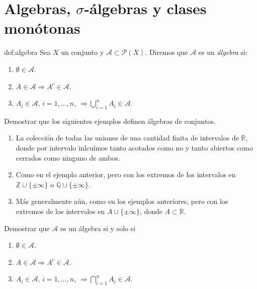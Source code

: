 \section{Algebras, $\sigma$-álgebras y clases monótonas}

\begin{definicion}{def:algebra} 
 Sea $X$ un conjunto y $\mathscr{A}\subset \mathcal{P}(X)$. Diremos que $\mathscr{A}$ es un \emph{álgebra} si:
 \begin{enumerate}
  \item $\emptyset\in\mathscr{A}$.
  \item $A\in\mathscr{A}\Rightarrow A^c\in\mathscr{A}$.
  \item $A_i\in\mathscr{A}$, $i=1,\ldots,n$, $\Rightarrow\bigcup_{i=1}^nA_i\in\mathscr{A}$.
 \end{enumerate}

\end{definicion}


\begin{ejercicio}{} Demostrar que los siguientes ejemplos definen álgebras de conjuntos.
 \begin{enumerate}
  \item La colección de todas las uniones de una cantidad finita de intervalos de $\mathbb{R}$, donde por intervalo inlcuímos tanto acotados como  no y tanto abiertos como cerrados como ninguno de ambos.
  \item Como en el ejemplo anterior, pero con los extremos de los intervalos en $\mathbb{Z}\cup \{\pm \infty\}$ o $\mathbb{Q}\cup \{\pm \infty\}$.
    \item Más generalmente aún, como en los ejemplos anteriores, pero con los extremos de los intervalos en $A\cup \{\pm \infty\}$, donde $A\subset\mathbb{R}$.
 \end{enumerate}
\end{ejercicio}
 \begin{ejercicio}{} Demostrar que $\mathscr{A}$  es un álgebra si y solo si
 \begin{enumerate}
  \item $\emptyset\in\mathscr{A}$.
  \item $A\in\mathscr{A}\Rightarrow A^c\in\mathscr{A}$.
  \item $A_i\in\mathscr{A}$, $i=1,\ldots,n$, $\Rightarrow\bigcap_{i=1}^nA_i\in\mathscr{A}$.
 \end{enumerate}
\end{ejercicio}

